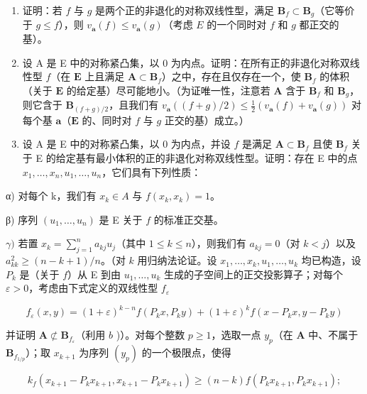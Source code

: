 \begin{enumerate}
\def\labelenumi{\alph{enumi})}
\item
  证明：若 \(f\) 与 \(g\) 是两个正的非退化的对称双线性型，满足 \(\mathbf{B}_f \subset \mathbf{B}_g\)（它等价于 \(g \leqslant f\)），则 \(v_{\mathbf{a}}(f) \leqslant v_{\mathbf{a}}(g)\)（考虑 \(E\) 的一个同时对 \(f\) 和 \(g\) 都正交的基）。
\item
  设 A 是 E 中的对称紧凸集，以 0 为内点。证明：在所有正的非退化对称双线性型 \(f\)（在 \(\mathbf{E}\) 上且满足 \(\mathbf{A} \subset \mathbf{B}_f\)）之中，存在且仅存在一个，使 \(\mathbf{B}_f\) 的体积（关于 \(\mathbf{E}\) 的给定基）尽可能地小。（为证唯一性，注意若 \(\mathbf{A}\) 含于 \(\mathbf{B}_f\) 和 \(\mathbf{B}_g\)，则它含于 \(\mathbf{B}_{(f + g)/2}\)，且我们有 \(v_{\mathbf{a}}((f + g)/2) \leqslant \frac{1}{2}(v_{\mathbf{a}}(f) + v_{\mathbf{a}}(g))\) 对每个基 \(\mathbf{a}\)（\(\mathbf{E}\) 的、同时对 \(f\) 与 \(g\) 正交的基）成立。）
\item
  设 A 是 E 中的对称紧凸集，以 0 为内点，并设 \(f\) 是满足 \(\mathbf{A} \subset \mathbf{B}_f\) 且使 \(\mathbf{B}_f\) 关于 E 的给定基有最小体积的正的非退化对称双线性型。证明：存在 E 中的点 \(x_1, \ldots, x_n, u_1, \ldots, u_n\)，它们具有下列性质：
\end{enumerate}

α) 对每个 k，我们有 \(x_{k} \in A\) 与 \(f(x_{k}, x_{k}) = 1\)。

β) 序列 \((u_{1},\dots,u_{n})\) 是 E 关于 \(f\) 的标准正交基。

\(\gamma)\) 若置 \(x_{k} = \sum_{j=1}^{n} a_{kj} u_{j}\)（其中 \(1 \leqslant k \leqslant n\)），则我们有 \(a_{kj} = 0\)（对 \(k < j\)）以及 \(a_{kk}^{2} \geqslant (n - k + 1)/n\)。（对 \(k\) 用归纳法论证。设 \(x_{1}, \ldots, x_{k}, u_{1}, \ldots, u_{k}\) 均已构造，设 \(P_{k}\) 是（关于 \(f\)）从 E 到由 \(u_{1}, \ldots, u_{k}\) 生成的子空间上的正交投影算子；对每个 \(\varepsilon > 0\)，考虑由下式定义的双线性型 \(f_{\varepsilon}\)

\[
f _ {\varepsilon} (x, y) = (1 + \varepsilon) ^ {k - n} f \left(P _ {k} x, P _ {k} y\right) + (1 + \varepsilon) ^ {k} f \left(x - P _ {k} x, y - P _ {k} y\right)
\]

并证明 \(\mathbf{A} \not\subset \mathbf{B}_{f_{\varepsilon}}\)（利用 \(b\) )）。对每个整数 \(p \geqslant 1\)，选取一点 \(y_{p}\)（在 \(\mathbf{A}\) 中、不属于 \(\mathbf{B}_{f_{1/p}}\)）；取 \(x_{k+1}\) 为序列 \((y_{p})\) 的一个极限点，使得

\[
k _ {f} \left(x _ {k + 1} - P _ {k} x _ {k + 1}, x _ {k + 1} - P _ {k} x _ {k + 1}\right) \geqslant (n - k) f \left(P _ {k} x _ {k + 1}, P _ {k} x _ {k + 1}\right);
\]

